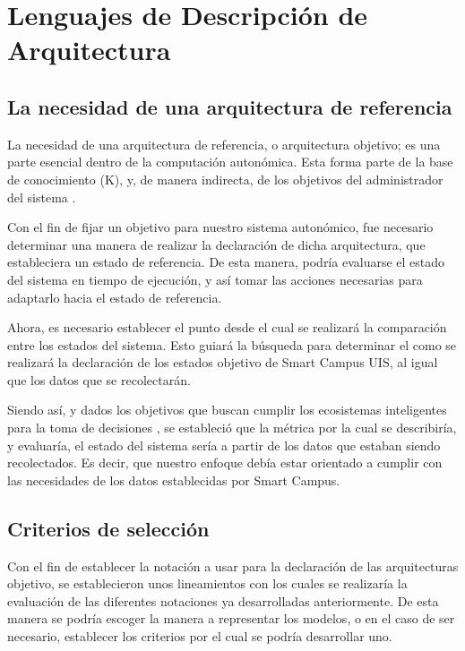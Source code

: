 \section{Lenguajes de Descripción de Arquitectura}

\subsection{La necesidad de una arquitectura de referencia}

La necesidad de una arquitectura de referencia, o arquitectura objetivo; es una parte esencial dentro de la computación autonómica. Esta forma parte de la base de conocimiento (K), y, de manera indirecta, de los objetivos del administrador del sistema \cite[p. 24]{lalanda_diaconescu_mccann_2014}. 

Con el fin de fijar un objetivo para nuestro sistema autonómico, fue necesario determinar una manera de realizar la declaración de dicha arquitectura, que estableciera un estado de referencia. De esta manera, podría evaluarse el estado del sistema en tiempo de ejecución,  y así tomar las acciones necesarias para adaptarlo hacia el estado de referencia. 


Ahora, es necesario establecer el punto desde el cual se realizará la comparación entre los estados del sistema. Esto guiará la búsqueda para determinar el como se realizará la declaración de los estados objetivo de Smart Campus UIS, al igual que los datos que se recolectarán.

Siendo así, y dados los objetivos que buscan cumplir los ecosistemas inteligentes para la toma de decisiones \cite{Anagnostopoulos_2023}, se estableció que la métrica por la cual se describiría, y evaluaría, el estado del sistema sería a partir de los datos que estaban siendo recolectados. Es decir, que nuestro enfoque debía estar orientado a cumplir con las necesidades de los datos establecidas por Smart Campus. 

\subsection{Criterios de selección}

Con el fin de establecer la notación a usar para la declaración de las arquitecturas objetivo, se establecieron unos lineamientos con los cuales se realizaría la evaluación de las diferentes notaciones ya desarrolladas anteriormente. De esta manera se podría escoger la manera a representar los modelos, o en el caso de ser necesario, establecer los criterios por el cual se podría desarrollar uno.

